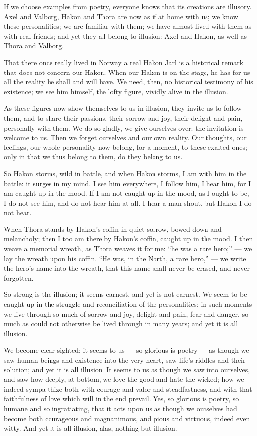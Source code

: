 \documentclass[12pt,a4paper]{book}
\begin{document}
If we choose examples from poetry, everyone knows that its creations are illusory. Axel and Valborg, Hakon and Thora are now as if at home with us; we know these personalities; we are familiar with them; we have almost lived with them as with real friends; and yet they all belong to illusion: Axel and Hakon, as well as Thora and Valborg.

That there once really lived in Norway a real Hakon Jarl is a historical remark that does not concern our Hakon. When our Hakon is on the stage, he has for us all the reality he shall and will have. We need,
then, no historical testimony of his existence; we see him himself, the lofty figure, vividly alive in the illusion.

As these figures now show themselves to us in illusion, they invite us to follow them, and to share their passions, their sorrow and joy, their delight and pain, personally with them. We do so gladly, we give ourselves over: the invitation is welcome to us. Then we forget ourselves and our own reality. Our thoughts, our feelings, our whole personality now belong, for a moment, to these exalted ones; only in that we thus belong to them, do they belong to us.

So Hakon storms, wild in battle, and when Hakon storms, I am with him in the battle: it surges in my mind. I see him everywhere, I follow him, I hear him, for I am caught up in the mood. If I am not caught up in the mood, as I ought to be, I do not see him, and do not hear him at all. I hear a man shout, but Hakon I do not hear.

When Thora stands by Hakon's coffin in quiet sorrow, bowed down and melancholy; then I too am there by Hakon's coffin, caught up in the mood. I then weave a memorial wreath, as Thora weaves it for me: ``he was a rare hero;'' --- we lay the wreath upon his coffin. ``He was, in the North, a rare hero,'' --- we write the hero's name into the wreath, that this name shall never be erased, and never forgotten.

So strong is the illusion; it seems earnest, and yet is not earnest. We seem to be caught up in the struggle and reconciliation of the personalities; in such moments we live through so much of sorrow and joy, delight and pain, fear and danger, so much as could not otherwise be lived through in many years; and yet it is all illusion.

We become clear-sighted; it seems to us --- so glorious is poetry --- as though we saw human beings and existence into the very heart, saw life's riddles and their solution; and yet it is all illusion. It seems to us as though we saw into ourselves, and saw how deeply, at bottom, we love the good and hate the wicked; how we indeed sympa\-%
thize both with courage and valor and steadfastness, and with that faithfulness of love which will in the end prevail. Yes, so glorious is poetry, so humane and so ingratiating, that it acts upon us as though we ourselves had become both courageous and magnanimous, and pious and virtuous, indeed even witty. And yet it is all illusion, alas, nothing but illusion.
\end{document}
